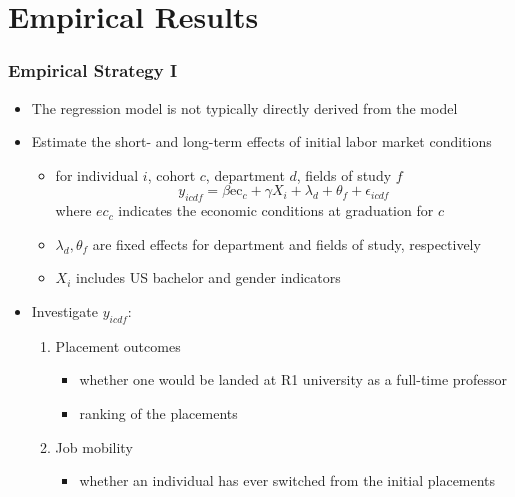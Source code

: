 \documentclass[10pt,svgnames,fragile]{beamer}
\begin{document}
\section{Empirical Results}
\begin{frame}
	\frametitle{Empirical Strategy I}
	\begin{itemize}
		\item The regression model is not typically directly derived from the  model
		\vfill
		\item Estimate the short- and long-term effects of initial labor market conditions 
			\begin{itemize}
				\item for individual $i$, cohort $c$, department $d$, fields of study $f$
				\begin{equation}
					y_{icdf} = \beta \text{ec}_{c}+\gamma X_{i}+\lambda_{d}+\theta_f  +\epsilon_{icdf}
				\end{equation}
				where $ec_c$ indicates the economic conditions at graduation for $c$
				\item $\lambda_{d},\theta_f $ are fixed effects for department and fields of study, respectively
				\item $X_i$ includes US bachelor and gender indicators
	\end{itemize}
	\vfill
			\item Investigate $y_{icdf}$:
			\begin{enumerate}
				\item Placement outcomes
				\begin{itemize}
					\item whether one would be landed at R1 university as a full-time professor
					\item ranking of the placements
				\end{itemize}
				\item Job mobility
				\begin{itemize}
				\item whether an individual has ever switched from the initial placements
				\end{itemize}
	\vfill
			\end{enumerate}
\end{itemize}
\end{frame}
\end{document}
